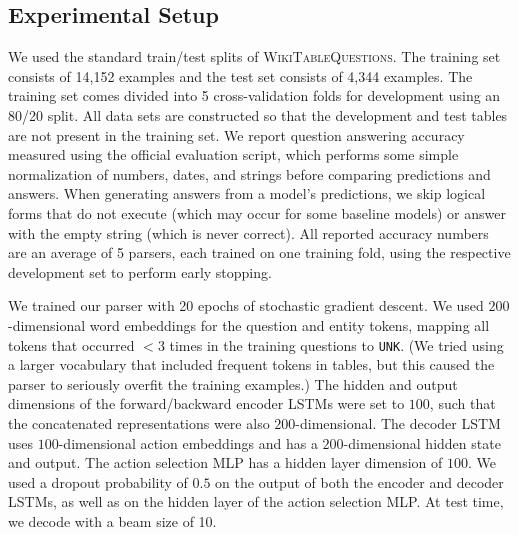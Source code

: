 \subsection{Experimental Setup}
We used the standard train/test splits of \textsc{WikiTableQuestions}.
The training set consists of 14,152 examples and the test set consists of 4,344 
examples.
The training set comes divided into 5 cross-validation folds for development 
using an 80/20 split.
All data sets are constructed so that the development and test tables are not 
present in the training set.
We report question answering accuracy measured using the official evaluation 
script, which performs some simple normalization of numbers, dates, and strings 
before comparing predictions and answers.
When generating answers from a model's predictions, we skip logical forms that 
do not execute (which may occur for some baseline models) or answer with the 
empty string (which is never correct).
All reported accuracy numbers are an average of 5 parsers, each trained on one 
training fold, using the respective development set to perform early stopping.

We trained our parser with 20 epochs of stochastic gradient descent. We used 
$200$-dimensional word embeddings for the question and entity tokens, mapping 
all tokens that occurred $<3$ times in the training questions to \texttt{UNK}. 
(We tried using a larger vocabulary that included frequent tokens in tables, 
but this caused the parser to seriously overfit the training examples.) The 
hidden and output dimensions of the forward/backward encoder LSTMs were set to 
$100$, such that the concatenated representations were also $200$-dimensional. 
The decoder LSTM uses $100$-dimensional action embeddings and has a 
$200$-dimensional hidden state and output. The action selection MLP has a 
hidden layer dimension of $100$. We used a dropout probability of $0.5$ on the 
output of both the encoder and decoder LSTMs, as well as on the hidden layer of 
the action selection MLP\@. At test time, we decode with a beam size of 10.

